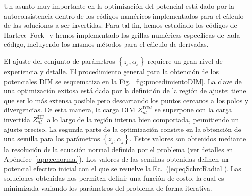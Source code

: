 Un asunto muy importante en la optimización del potencial está dado por 
la autoconsistencia dentro de los códigos numéricos implementados para 
el cálculo de las soluciones a ser invertidas. Para tal fin, hemos 
estudiado los códigos de Hartree--Fock~\cite{FroeseFischer:97,
Johnson:07} y hemos implementado las grillas numéricas específicas de 
cada código, incluyendo los mismos métodos para el cálculo de derivadas. 

El ajuste del conjunto de parámetros $\left\{z_j,\alpha_j\right\}$ 
requiere un gran nivel de experiencia y detalle. El procedimiento 
general para la obtención de los potenciales DIM se esquematiza en la 
Fig.~\ref{fig:procedimientoDIM}. La clave de una optimización exitosa 
está dada por la definición de la región de ajuste: tiene que ser lo más 
extensa posible pero descartando los puntos cercanos a los polos y 
divergencias. De esta manera, la carga DIM $Z_{nl}^{\mathrm{DIM}}$ se 
superpone con la carga invertida $Z_{nl}^{\mathrm{HF}}$ a lo largo de la 
región interna bien comportada, permitiendo un ajuste preciso. La 
segunda parte de la optimización consiste en la obtención de una semilla 
para los parámetros $\left\{z_j,\alpha_j\right\}$. Estos valores son 
obtenidos mediante la resolución de la ecuación normal definida por el 
problema (ver detalles en Apéndice~\ref{app:ecnormal}). Los valores de 
las semillas obtenidas definen un potencial efectivo inicial con el que 
se resuelve la Ec.~(\ref{eq:eqSchroRadial}). Las soluciones obtenidas 
nos permiten definir una función de costo, la cual es minimizada 
variando los parámetros del problema de forma iterativa. 

